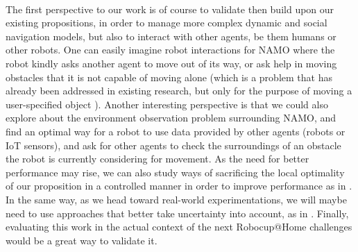 \paragraph{} The first perspective to our work is of course to validate then build upon our existing propositions, in order to manage more complex dynamic and social navigation models, but also to interact with other agents, be them humans or other robots. One can easily imagine robot interactions for NAMO where the robot kindly asks another agent to move out of its way, or ask help in moving obstacles that it is not capable of moving alone (which is a problem that has already been addressed in existing research, but only for the purpose of moving a user-specified object \parencite{amato_planning_2015}). Another interesting perspective is that we could also explore about the environment observation problem surrounding NAMO, and find an optimal way for a robot to use data provided by other agents (robots or IoT sensors), and ask for other agents to check the surroundings of an obstacle the robot is currently considering for movement. As the need for better performance may rise, we can also study ways of sacrificing the local optimality of our proposition in a controlled manner in order to improve performance as in \parencite{levihn_planning_2013}. In the same way, as we head toward real-world experimentations, we will maybe need to use approaches that better take uncertainty into account, as in \parencite{stilman_planning_2007, levihn_foresight_2013, levihn_planning_2013, scholz_navigation_2016}. Finally, evaluating this work in the actual context of the next Robocup@Home challenges would be a great way to validate it.

